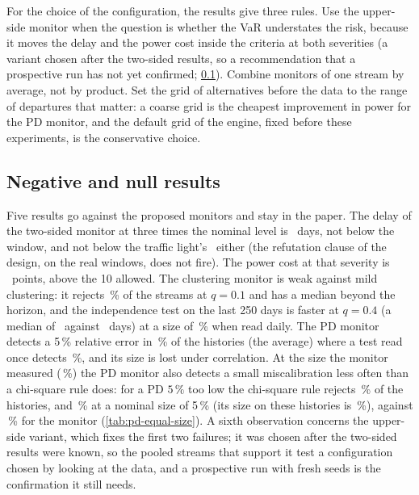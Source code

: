 For the choice of the configuration, the results give three rules. Use the upper-side monitor when the question is whether the VaR understates the risk, because it moves the delay and the power cost inside the criteria at both severities (a variant chosen after the two-sided results, so a recommendation that a prospective run has not yet confirmed; \cref{sec:discussion-negative}). Combine monitors of one stream by average, not by product. Set the grid of alternatives before the data to the range of departures that matter: a coarse grid is the cheapest improvement in power for the PD monitor, and
the default grid of the engine, fixed before these experiments, is the conservative choice.

\subsection{Negative and null results}
\label{sec:discussion-negative}

Five results go against the proposed monitors and stay in the paper. The delay of the two-sided monitor at three times the nominal level is \nSeedsThreeMed\ days, not below the window, and not below the traffic light's \nSeedsThreeLight\ either (the refutation clause of the design, on the real windows, does not fire). The power cost at that severity is \nSeedsThreeCost\ points, above the 10 allowed. The clustering monitor is weak against mild clustering: it rejects \nCluOneTenthCluster\,\% of the streams at $q=0.1$ and has a median beyond the horizon,
and the independence test on the last 250 days is faster at $q=0.4$ (a median of \nCluMedFourTenthIndep\ against \nCluMedFourTenthCluster\ days) at a size of \nNullSizeIndep\,\% when read daily. The PD monitor detects a 5\,\% relative error in \nPdOneZeroFiveAvg\,\% of the histories (the average) where a test read once detects \nPdOneZeroFiveChiOne\,\%, and its size is lost under correlation. At the size the monitor measured (\nPdcMatchedSize\,\%) the PD monitor also detects a small miscalibration less often than a chi-square rule does: for a PD $5\,\%$ too low the chi-square rule rejects \nPdcOneZeroFiveChiMatched\,\% of the histories, and \nPdcOneZeroFiveChiSim\,\% at a nominal size of 5\,\% (its size on these histories is \nPdcOneChiSim\,\%), against \nPdOneZeroFiveAvg\,\% for the monitor (\cref{tab:pd-equal-size}). A sixth observation concerns the upper-side variant, which fixes the first two failures; it was chosen after the two-sided results were known, so the pooled streams that support it test a configuration chosen by looking at the data, and a prospective run with fresh seeds is the confirmation it still needs.
